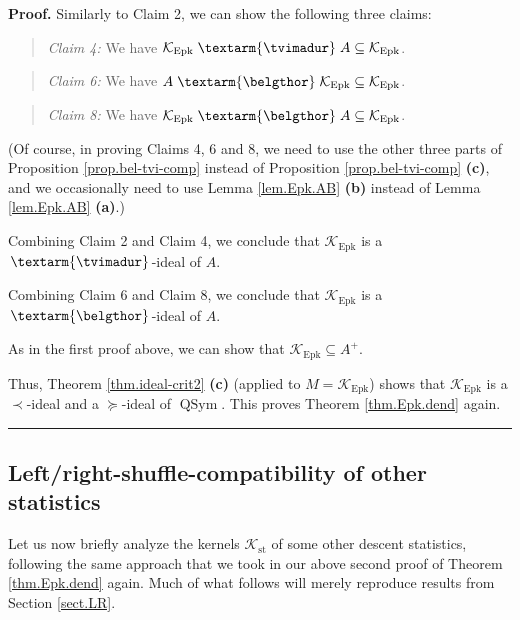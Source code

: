 \documentclass[numbers=enddot,12pt,final,onecolumn,notitlepage]{scrartcl}%
\theoremstyle{definition}
\newenvironment{statement}{\begin{quote}}{\end{quote}}
\newenvironment{proof}[1][Proof]{\noindent\textbf{#1.} }{\ \rule{0.5em}{0.5em}}
\newenvironment{verlong}{}{}
\newcommand{\tvi}{\left. \textarm{\tvimadur} \right.}
\newcommand{\bel}{\left. \textarm{\belgthor} \right.}
\begin{document}
\begin{verlong}
\begin{proof}
Similarly to Claim 2, we can show the following three claims:

\begin{statement}
\textit{Claim 4:} We have $\mathcal{K}_{\operatorname{Epk}}\tvi
A\subseteq\mathcal{K}_{\operatorname{Epk}}$.
\end{statement}

\begin{statement}
\textit{Claim 6:} We have $A\bel\mathcal{K}_{\operatorname{Epk}}%
\subseteq\mathcal{K}_{\operatorname{Epk}}$.
\end{statement}

\begin{statement}
\textit{Claim 8:} We have $\mathcal{K}_{\operatorname{Epk}}\bel
A\subseteq\mathcal{K}_{\operatorname{Epk}}$.
\end{statement}

(Of course, in proving Claims 4, 6 and 8, we need to use the other three parts
of Proposition \ref{prop.bel-tvi-comp} instead of Proposition
\ref{prop.bel-tvi-comp} \textbf{(c)}, and we occasionally need to use Lemma
\ref{lem.Epk.AB} \textbf{(b)} instead of Lemma \ref{lem.Epk.AB} \textbf{(a)}.)

Combining Claim 2 and Claim 4, we conclude that $\mathcal{K}%
_{\operatorname{Epk}}$ is a $\tvi$-ideal of $A$.

Combining Claim 6 and Claim 8, we conclude that $\mathcal{K}%
_{\operatorname{Epk}}$ is a $\bel$-ideal of $A$.

As in the first proof above, we can show that
$\mathcal{K}_{\operatorname{Epk}} \subseteq A^+$.

Thus, Theorem \ref{thm.ideal-crit2} \textbf{(c)} (applied to $M=\mathcal{K}%
_{\operatorname{Epk}}$) shows that $\mathcal{K}_{\operatorname{Epk}}$ is a
$\left.  \prec\right.  $-ideal and a $\left.  \succeq\right.  $-ideal of
$\operatorname*{QSym}$. This proves Theorem \ref{thm.Epk.dend} again.
\end{proof}

\subsection{\label{subsect.dendri.other-stats}Left/right-shuffle-compatibility
of other statistics}

Let us now briefly analyze the kernels $\mathcal{K}_{\operatorname{st}}$ of
some other descent statistics, following the same approach that we took in our
above second proof of Theorem \ref{thm.Epk.dend} again. Much of what follows
will merely reproduce results from Section \ref{sect.LR}.


\end{verlong}
\end{document}
